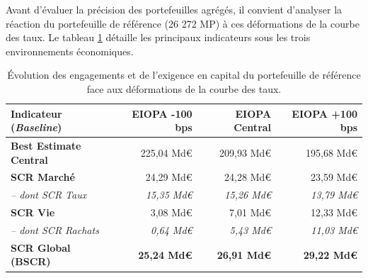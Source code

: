 Avant d'évaluer la précision des portefeuilles agrégés, il convient d'analyser la réaction du portefeuille de référence (26 272 MP) à ces déformations de la courbe des taux. Le tableau \ref{tab:baseline_sensibilites} détaille les principaux indicateurs sous les trois environnements économiques.

\begin{table}[H]
    \centering
    \renewcommand{\arraystretch}{1.4}
    \begin{tabular}{|l|r|r|r|}
        \hline
        \textbf{Indicateur (\textit{Baseline})} & \textbf{EIOPA -100 bps} & \textbf{EIOPA Central} & \textbf{EIOPA +100 bps} \\
        \hline
        \textbf{Best Estimate Central} & 225{,}04 Md\euro{} & 209{,}93 Md\euro{} & 195{,}68 Md\euro{} \\
        \hline
        \textbf{SCR Marché} & 24{,}29 Md\euro{} & 24{,}28 Md\euro{} & 23{,}59 Md\euro{} \\
        \textit{-- dont SCR Taux} & \textit{15{,}35 Md\euro{}} & \textit{15{,}26 Md\euro{}} & \textit{13{,}79 Md\euro{}} \\
        \textbf{SCR Vie} & 3{,}08 Md\euro{} & 7{,}01 Md\euro{} & 12{,}33 Md\euro{} \\
        \textit{-- dont SCR Rachats} & \textit{0{,}64 Md\euro{}} & \textit{5{,}43 Md\euro{}} & \textit{11{,}03 Md\euro{}} \\
        \hline
        \textbf{SCR Global (BSCR)} & \textbf{25{,}24 Md\euro{}} & \textbf{26{,}91 Md\euro{}} & \textbf{29{,}22 Md\euro{}} \\
        \hline
    \end{tabular}
    \caption{Évolution des engagements et de l'exigence en capital du portefeuille de référence face aux déformations de la courbe des taux.}
    \label{tab:baseline_sensibilites}
\end{table}

